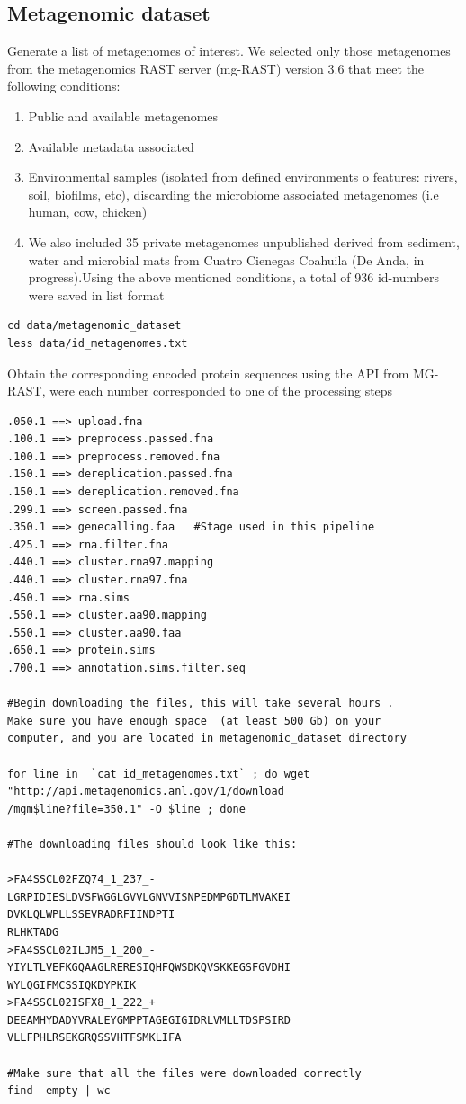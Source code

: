 \documentclass[a4paper,11pt]{report}
\begin{document}
\subsection{Metagenomic dataset}

Generate a list of metagenomes of interest. We selected only those metagenomes from the metagenomics RAST server (mg-RAST) version 3.6 that meet the following conditions:
\begin{enumerate}
\item Public and available metagenomes
\item Available metadata associated 
\item Environmental samples (isolated from defined environments o features: rivers, soil, biofilms, etc), discarding the microbiome associated metagenomes (i.e human, cow, chicken)
\item We also included 35 private metagenomes unpublished derived from sediment, water and microbial mats from Cuatro Cienegas Coahuila (De Anda, in progress).Using the above mentioned conditions, a total of 936 id-numbers were saved in list format
\end{enumerate}

\begin{verbatim}
cd data/metagenomic_dataset
less data/id_metagenomes.txt
\end{verbatim}

Obtain the corresponding encoded protein sequences using the API from MG-RAST, were each number corresponded to one of the processing steps 

\begin{verbatim}
.050.1 ==> upload.fna                 
.100.1 ==> preprocess.passed.fna      
.100.1 ==> preprocess.removed.fna     
.150.1 ==> dereplication.passed.fna   
.150.1 ==> dereplication.removed.fna  
.299.1 ==> screen.passed.fna          
.350.1 ==> genecalling.faa   #Stage used in this pipeline  
.425.1 ==> rna.filter.fna             
.440.1 ==> cluster.rna97.mapping      
.440.1 ==> cluster.rna97.fna          
.450.1 ==> rna.sims                   
.550.1 ==> cluster.aa90.mapping       
.550.1 ==> cluster.aa90.faa           
.650.1 ==> protein.sims               
.700.1 ==> annotation.sims.filter.seq 

#Begin downloading the files, this will take several hours . 
Make sure you have enough space  (at least 500 Gb) on your 
computer, and you are located in metagenomic_dataset directory

for line in  `cat id_metagenomes.txt` ; do wget 
"http://api.metagenomics.anl.gov/1/download
/mgm$line?file=350.1" -O $line ; done

#The downloading files should look like this:

>FA4SSCL02FZQ74_1_237_-
LGRPIDIESLDVSFWGGLGVVLGNVVISNPEDMPGDTLMVAKEI
DVKLQLWPLLSSEVRADRFIINDPTI
RLHKTADG
>FA4SSCL02ILJM5_1_200_-
YIYLTLVEFKGQAAGLRERESIQHFQWSDKQVSKKEGSFGVDHI
WYLQGIFMCSSIQKDYPKIK
>FA4SSCL02ISFX8_1_222_+
DEEAMHYDADYVRALEYGMPPTAGEGIGIDRLVMLLTDSPSIRD
VLLFPHLRSEKGRQSSVHTFSMKLIFA

#Make sure that all the files were downloaded correctly 
find -empty | wc
\end{verbatim}
\end{document}
